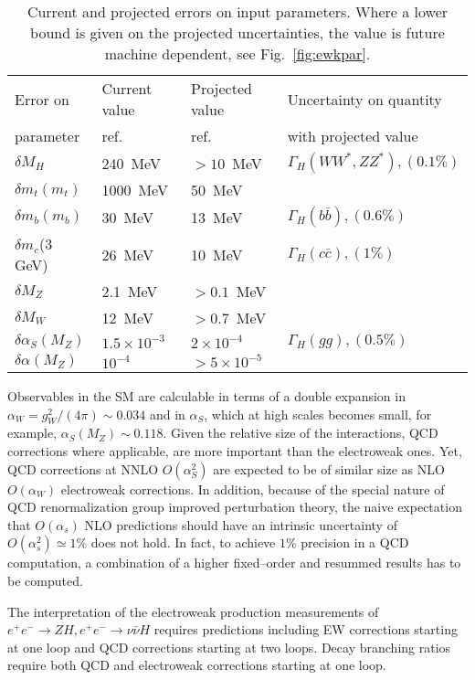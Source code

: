 \documentclass[../report.tex]{subfiles}
\newcommand{\ew}{electroweak\xspace}
\begin{document}
\begin{table}
\begin{center}
\caption{Current and projected errors on input parameters. Where a lower bound 
is given on the projected uncertainties, the value is future machine dependent, see 
Fig.~\ref{fig:ewkpar}.}
\label{PUncertainties}
\begin{tabular}{|l|l|l|l|}
\hline
Error on&  Current value & Projected value & Uncertainty on  quantity\\
parameter &  ref.\cite{deFlorian:2016spz} & ref.\cite{Freitas:2019bre} & with projected value \\
\hline
$\delta M_H$  & 240~MeV & $>10$~MeV & $\Gamma_H(WW^*,ZZ^*),(0.1\%)$\\
$\delta m_t(m_t)$  & 1000~MeV & 50~MeV& \\
$\delta m_b(m_b)$  & 30~MeV & 13~MeV & $\Gamma_H(b \bar{b}),(0.6\%)$ \\
$\delta m_c$(3 GeV)  & 26~MeV & 10~MeV & $\Gamma_H(c \bar{c}),(1\%)$\\
$\delta M_Z$  & 2.1~MeV & $>0.1$~MeV & \\
$\delta M_W$  & 12~MeV & $>0.7$~MeV & \\
$\delta \alpha_S(M_Z)$  & $1.5\times 10^{-3}$ & $2\times 10^{-4}$& $\Gamma_H(gg),(0.5\%)$\\
$\delta \alpha(M_Z)$  & $10^{-4}$ &  $>5\times 10^{-5}$& \\
\hline
\end{tabular}
\end{center}
\end{table}

Observables in the SM are calculable in terms of a double expansion in 
$\alpha_W =g_W^2/(4 \pi) \sim 0.034$ and in $\alpha_S$, which at high scales becomes small, for example,  $\alpha_S(M_Z)\sim 0.118$. Given the relative size of the interactions,  QCD corrections where applicable,  are more important than the \ew ones. Yet, QCD corrections at NNLO $O(\alpha_S^2)$ are expected to be of similar size as NLO $O(\alpha_W)$ \ew corrections. In addition, because of the special nature of QCD renormalization group improved perturbation theory, 
the naive expectation that $O(\alpha_s)$ NLO predictions should have an intrinsic uncertainty of $O(\alpha_s^2) \simeq 1\%$ does not hold. In fact, to achieve $1\%$ precision in a QCD computation, a combination of a higher fixed--order and resummed results has to be computed. 

The interpretation of the \ew production measurements of $e^+ e^- \to ZH, e^+ e^-\to \nu \bar{\nu} H$ requires predictions including EW corrections starting at one loop and QCD corrections starting at two loops. Decay branching ratios require both QCD and \ew corrections starting at one loop. 
\end{document}
